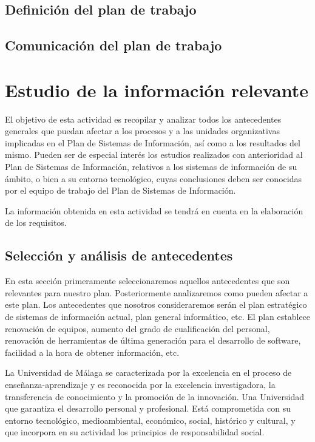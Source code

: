 \documentclass[12pt,a4paper,spanish,twoside]{book}
\begin{document}
\begin{enumerate}
\begin{itemize}
\section{Definición del plan de trabajo}

\section{Comunicación del plan de trabajo}


\chapter{Estudio de la información relevante}
El objetivo de esta actividad es recopilar y analizar todos los antecedentes
generales que puedan afectar a los procesos y a las unidades organizativas
implicadas en el Plan de Sistemas de Información, así como a los resultados
del mismo. Pueden ser de especial interés los estudios realizados con
anterioridad al Plan de Sistemas de Información, relativos a los sistemas de
información de su ámbito, o bien a su entorno tecnológico, cuyas conclusiones
deben ser conocidas por el equipo de trabajo del Plan de Sistemas de
Información. 

La información obtenida en esta actividad se tendrá en cuenta en
la elaboración de los requisitos.

\section{Selección y análisis de antecedentes}
 En esta sección primeramente seleccionaremos aquellos antecedentes que son
 relevantes para nuestro plan. Posteriormente analizaremos como pueden
 afectar a este plan. Los antecedentes que nosotros consideraremos serán el
 plan estratégico de sistemas de información actual, plan general
 informático, etc. 
 El plan establece renovación de equipos, aumento del grado de cualificación
 del personal, renovación de herramientas de última generación para el
 desarrollo de software, facilidad a la hora de obtener información, etc. 

 La Universidad de Málaga se caracterizada por la excelencia en el proceso de
 enseñanza-aprendizaje y es reconocida por la excelencia investigadora, la
 transferencia de conocimiento y la promoción de la innovación. Una
 Universidad que garantiza el desarrollo personal y profesional. Está
 comprometida con su entorno tecnológico, medioambiental, económico, social,
 histórico y cultural, y que incorpora en su actividad los principios de
 responsabilidad social. 


\end{itemize}
\end{enumerate}
\end{document}
